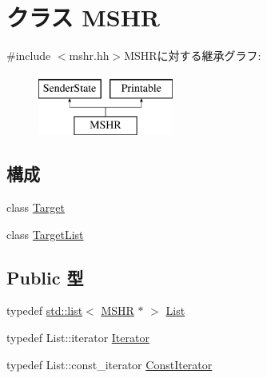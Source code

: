 \hypertarget{classMSHR}{
\section{クラス MSHR}
\label{classMSHR}
}


{\ttfamily \#include $<$mshr.hh$>$}MSHRに対する継承グラフ:\begin{figure}[H]
\begin{center}
\leavevmode
\includegraphics[height=2cm]{classMSHR}
\end{center}
\end{figure}
\subsection*{構成}
\begin{DoxyCompactItemize}
\item 
class \hyperlink{classMSHR_1_1Target}{Target}
\item 
class \hyperlink{classMSHR_1_1TargetList}{TargetList}
\end{DoxyCompactItemize}
\subsection*{Public 型}
\begin{DoxyCompactItemize}
\item 
typedef \hyperlink{classstd_1_1list}{std::list}$<$ \hyperlink{classMSHR}{MSHR} $\ast$ $>$ \hyperlink{classMSHR_ad558dcd5b6beb35c76724ab05f90a077}{List}
\item 
typedef List::iterator \hyperlink{classMSHR_af944263ff3027ab76cf07354d3a3f0c6}{Iterator}
\item 
typedef List::const\_\-iterator \hyperlink{classMSHR_a91267e1b9ec14096dd01900290a0ba15}{ConstIterator}
\end{DoxyCompactItemize}
